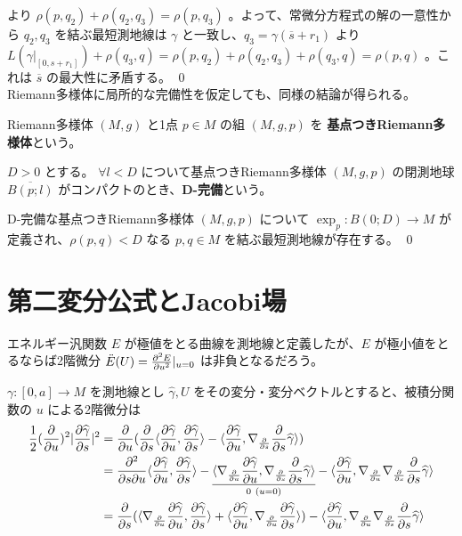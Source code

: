 \documentclass[dvipdfmx,a4paper]{jsreport}
\theoremstyle{definition}
\newcommand{\der}{\partial}
\renewcommand{\bar}{\overline}
\renewcommand{\hat}{\widehat}
\begin{document}
より $\rho(p,q_2)+\rho(q_2,q_3)=\rho(p,q_3)$ 。よって、常微分方程式の解の一意性から $q_2,q_3$ を結ぶ最短測地線は $\gamma$ と一致し、$q_3=\gamma(\bar{s}+r_1)$ より $L(\gamma|_[0,s+r_1])+\rho(q_3,q)=\rho(p,q_2)+\rho(q_2,q_3)+\rho(q_3,q)=\rho(p,q)$ 。これは $\bar{s}$ の最大性に矛盾する。 \qed \\


Riemann多様体に局所的な完備性を仮定しても、同様の結論が得られる。

 Riemann多様体 $(M,g)$ と1点 $p \in M$ の組 $(M,g,p)$ を \textbf{基点つきRiemann多様体}という。

 $D>0$ とする。 $\forall l<D$ について基点つきRiemann多様体 $(M,g,p)$ の閉測地球 $\overline{B(p;l)}$ がコンパクトのとき、\textbf{D-完備}という。

\thm D-完備な基点つきRiemann多様体 $(M,g,p)$ について $\exp_p:B(0;D)\to M$ が定義され、$\rho(p,q)<D$ なる $p,q \in M$ を結ぶ最短測地線が存在する。 \qed
 


\section{第二変分公式とJacobi場}
エネルギー汎関数 $E$ が極値をとる曲線を測地線と定義したが、$E$ が極小値をとるならば2階微分 $\ddot{E}(U)={\der^2 E \over \der u^2}|_{u=0}$ は非負となるだろう。

$\gamma:[0,a] \to M$ を測地線とし $\hat{\gamma},U$ をその変分・変分ベクトルとすると、被積分関数の $u$ による2階微分は
\begin{align*}
    {1 \over 2}({\der \over \der u})^2|{\der \hat{\gamma} \over \der s}|^2 &= {\der \over \der u}({\der \over \der s} \langle {\der\hat{\gamma} \over \der u},{\der\hat{\gamma} \over \der s} \rangle-\langle {\der \hat{\gamma} \over \der u},\nabla_{\der \over \der s}{\der \over \der s}\hat{\gamma} \rangle) \\
    &= {\der^2\over \der s \der u}\langle {\der\hat{\gamma} \over \der u},{\der\hat{\gamma} \over \der s} \rangle
    -\underset{0\ (u=0)}{\underline{\langle \nabla_{\der \over \der u}{\der \hat{\gamma} \over \der u},\nabla_{\der \over \der s}{\der \over \der s}\hat{\gamma} \rangle}}
    -\langle {\der \hat{\gamma} \over \der u},\nabla_{\der \over \der u} \nabla_{\der \over \der s}{\der \over \der s}\hat{\gamma} \rangle \\
    &= {\der \over \der s}(\langle \nabla_{\der \over \der u}{\der\hat{\gamma} \over \der u},{\der\hat{\gamma} \over \der s} \rangle
    +\langle {\der\hat{\gamma} \over \der u},\nabla_{\der \over \der u}{\der\hat{\gamma} \over \der s} \rangle)
    -\langle {\der \hat{\gamma} \over \der u},\nabla_{\der \over \der u} \nabla_{\der \over \der s}{\der \over \der s}\hat{\gamma} \rangle
\end{align*}
\end{document}
